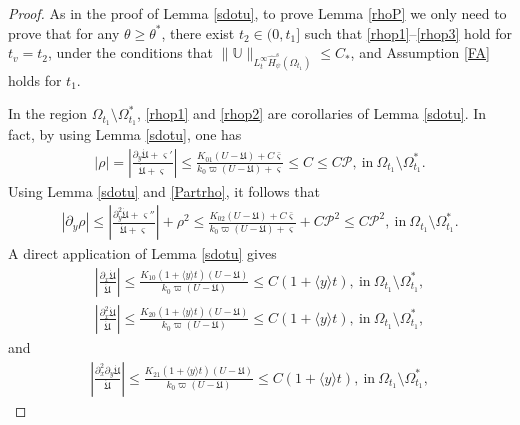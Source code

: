 \documentclass{amsart}
\numberwithin{equation}{section}
\newcommand\y{{{\langle y \rangle}}}
\begin{document}
\begin{proof}

As in the proof of Lemma \ref{sdotu}, to prove Lemma \ref{rhoP} we only need to prove that for any $\theta\geq \theta^{*}$, there exist $t_{2}\in(0,t_{1}]$ such that \eqref{rhop1}--\eqref{rhop3} hold for $t_{v}=t_{2}$, under the conditions that $\|\mathbb{U}\|_{L_{t}^{\infty}\hat{H}_{\psi}^{s}(\Omega_{t_{1}})}\leq C_{*}$, and Assumption \ref{FA} holds for $t_{1}$.


In the region $\Omega_{t_{1}}\setminus\Omega_{t_{1}}^{*}$, \eqref{rhop1} and \eqref{rhop2} are corollaries of Lemma \ref{sdotu}.
In fact, by using Lemma \ref{sdotu}, one has
\begin{align}\label{Partrho}
|\rho|
=\left|\frac{\partial_{y}\dot{\mathfrak{U}}+\varsigma'}{\dot{\mathfrak{U}}+\varsigma}\right|
\leq \frac{K_{01}(U-\mathfrak{U})+C\bar{\varsigma}}{k_{0}\varpi(U-\mathfrak{U})+\varsigma}
\leq C
\leq C\mathcal{P},~\text{in}~\Omega_{t_{1}}\setminus\Omega_{t_{1}}^{*}.
\end{align}
Using Lemma \ref{sdotu} and \eqref{Partrho}, it follows that
\begin{align}\label{Partrhoy}
|\partial_{y}\rho|
\leq \left|\frac{\partial_{y}^{2}\dot{\mathfrak{U}}+\varsigma''}{\dot{\mathfrak{U}}+\varsigma}\right|+\rho^{2}
\leq \frac{K_{02}(U-\mathfrak{U})+C\bar{\varsigma}}{k_{0}\varpi(U-\mathfrak{U})+\varsigma}+C\mathcal{P}^{2}
\leq C\mathcal{P}^{2},~\text{in}~\Omega_{t_{1}}\setminus\Omega_{t_{1}}^{*}.
\end{align}
A direct application of Lemma \ref{sdotu} gives
\begin{align*}
\left|\frac{\partial_{x}\dot{\mathfrak{U}}}{\dot{\mathfrak{U}}}\right|
\leq \frac{K_{10}(1+\y t)(U-\mathfrak{U})}{k_{0}\varpi(U-\mathfrak{U})}
\leq C(1+\y t), ~\text{in}~\Omega_{t_{1}}\setminus\Omega_{t_{1}}^{*},
\end{align*}
\begin{align*}
\left|\frac{\partial_{x}^{2}\dot{\mathfrak{U}}}{\dot{\mathfrak{U}}}\right|
\leq \frac{K_{20}(1+\y t)(U-\mathfrak{U})}{k_{0}\varpi(U-\mathfrak{U})}
\leq C(1+\y t), ~\text{in}~\Omega_{t_{1}}\setminus\Omega_{t_{1}}^{*},
\end{align*}
and
\begin{align*}
\left|\frac{\partial_{x}^{2}\partial_{y}\dot{\mathfrak{U}}}{\dot{\mathfrak{U}}}\right|
\leq \frac{K_{21}(1+\y t)(U-\mathfrak{U})}{k_{0}\varpi(U-\mathfrak{U})}
\leq C(1+\y t), ~\text{in}~\Omega_{t_{1}}\setminus\Omega_{t_{1}}^{*},
\end{align*}

\end{proof}
\end{document}
